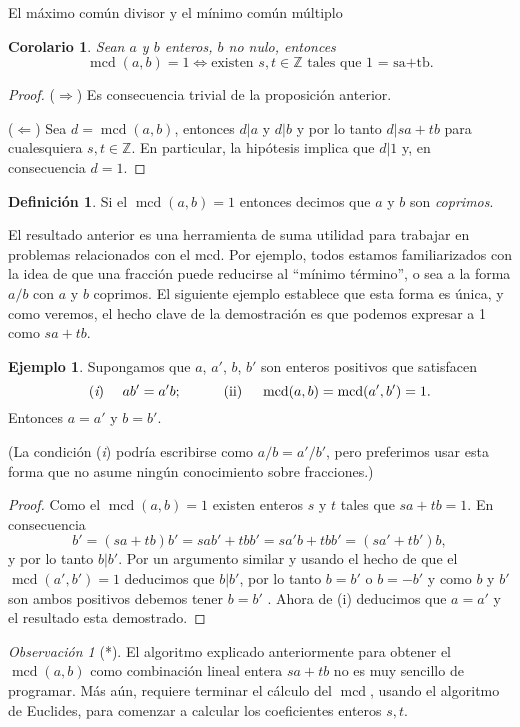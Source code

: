 \documentclass[11pt,spanish,makeidx]{amsbook}
\newtheorem{corolario}[teorema]{Corolario}
\theoremstyle{definition}
\newtheorem{definicion}{Definici\'on}[section]
\newtheorem{ejemplo}{Ejemplo}[section]
\theoremstyle{remark}
\newtheorem{observacion}{Observaci\'on}[section]
\newcommand \mcd{\operatorname{mcd}}
\begin{document}
\begin{section}{El máximo común divisor y el mínimo común múltiplo}
\begin{corolario} Sean $a$ y $b$ enteros, $b$ no nulo, entonces
$$
\mcd(a,b) = 1 \Leftrightarrow \text{existen $s,t \in \mathbb Z$ tales que 1 = sa+tb.}
$$
\end{corolario}
\begin{proof}
($\Rightarrow$) Es consecuencia trivial de la proposición anterior.

($\Leftarrow$) Sea $d = \mcd(a,b)$, entonces $d|a$ y $d|b$ y por lo tanto $d|sa+tb$ para cualesquiera   $s,t \in \mathbb Z$.  En particular, la hipótesis implica que $d|1$ y, en consecuencia $d =1$. 
\end{proof}

\begin{definicion}
Si el $\mcd(a,b)=1$ entonces decimos que $a$ y $ b$ son {\em coprimos}.
\end{definicion}

El resultado  anterior  es una herramienta de suma utilidad para trabajar en problemas relacionados con el mcd. Por ejemplo, todos estamos familiarizados con la idea de que una fracción puede reducirse al ``mínimo término'', o sea a la forma $a/b$ con $a$ y $b$ coprimos. El siguiente ejemplo establece que esta forma es única, y como veremos, el hecho clave de la demostración es que podemos expresar a 1 como $sa+tb$.

\begin{ejemplo} Supongamos que $a$, $a'$, $b$, $b'$ son enteros positivos que satisfacen
$$
\text{({\em i}) }\quad ab'=a'b; \qquad\quad\text{(ii) }
\quad\mcd(a,b)=\mcd(a',b')=1.
$$
Entonces $a=a'$ y $b=b' $.

(La condición ({\em i}) podría escribirse como $a/b=a'/b'$, pero preferimos usar esta forma que no asume ningún conocimiento sobre fracciones.)
\end{ejemplo}
\begin{proof} Como el $\mcd (a,b) =1$ existen enteros $s$ y $t$ tales que $sa+tb=1$. En consecuencia
$$
b'=(sa+tb)b' =sab'+tbb' = sa'b + tbb'=(sa'+tb')b,
$$
y por lo tanto $b|b'$. Por un argumento similar y usando el hecho de que el $\mcd(a',b')=1 $ deducimos que $b|b'$, por lo tanto $b=b'$ o $b=-b'$ y como $b $ y $b'$ son ambos positivos debemos tener $b=b'$ . Ahora de (i) deducimos que $a=a'$ y el resultado esta demostrado.
\end{proof}

\begin{observacion}[*]
El  algoritmo explicado anteriormente para obtener el $\mcd(a,b)$ como combinación lineal entera $sa+tb$ no es muy sencillo de programar. Más aún, requiere terminar el cálculo del $\mcd$, usando el algoritmo de Euclides, para comenzar a calcular los coeficientes enteros $s,t$. 


\end{observacion}
\end{section}
\end{document}
